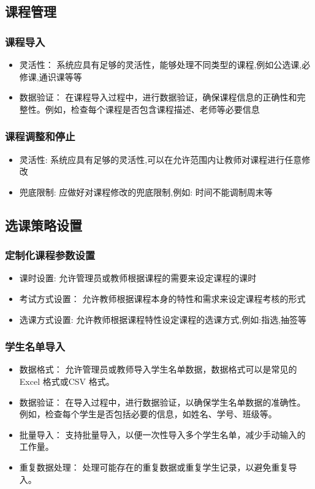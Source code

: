 \documentclass{article}
\begin{document}
\subsection{课程管理}
\subsubsection{课程导入}
\begin{itemize}
        \item 灵活性： 系统应具有足够的灵活性，能够处理不同类型的课程,例如公选课,必修课,通识课等等
        \item 数据验证： 在课程导入过程中，进行数据验证，确保课程信息的正确性和完整性。例如，检查每个课程是否包含课程描述、老师等必要信息
\end{itemize}
\subsubsection{课程调整和停止}
\begin{itemize}
        \item 灵活性: 系统应具有足够的灵活性,可以在允许范围内让教师对课程进行任意修改
        \item 兜底限制: 应做好对课程修改的兜底限制,例如: 时间不能调制周末等
\end{itemize}

\subsection{选课策略设置}
\subsubsection{定制化课程参数设置}
\begin{itemize}
        \item 课时设置: 允许管理员或教师根据课程的需要来设定课程的课时
        \item 考试方式设置： 允许教师根据课程本身的特性和需求来设定课程考核的形式
        \item 选课方式设置: 允许教师根据课程特性设定课程的选课方式,例如:指选,抽签等
\end{itemize}
\subsubsection{学生名单导入}
\begin{itemize}
        \item 数据格式： 允许管理员或教师导入学生名单数据，数据格式可以是常见的 Excel 格式或CSV 格式。
        \item 数据验证： 在导入过程中，进行数据验证，以确保学生名单数据的准确性。例如，检查每个学生是否包括必要的信息，如姓名、学号、班级等。
        \item 批量导入： 支持批量导入，以便一次性导入多个学生名单，减少手动输入的工作量。
        \item 重复数据处理： 处理可能存在的重复数据或重复学生记录，以避免重复导入。
\end{itemize}
\end{document}
